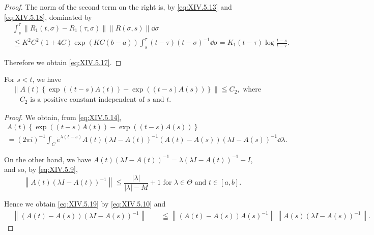 \begin{proof}
The norm of the second term on the right is, by \eqref{eq:XIV.5.13} and \eqref{eq:XIV.5.18}, dominated by 
\[
\begin{aligned}
&\int_{s} ^{\tau} \left\| R _{1} (t, \sigma) - R _{1} (\tau , \sigma) \right\| \left\| R (\sigma , s) \right\| \dd \sigma
\\
&\leqq K ^{2} C ^{2} (1 + 4 C) \exp (K C (b - a)) \int_{s} ^{\tau} (t - \tau) (t - \sigma) ^{-1} \dd \sigma = K _{1} (t - \tau) \log \frac {t - s}{t - \tau}.
\end{aligned}
\]

Therefore we obtain \eqref{eq:XIV.5.17}. 
\end{proof}

\begin{lemma}\label{lem:XIV.5.Lemma.3} For $s < t$, we have 
\begin{equation}\label{eq:XIV.5.19}
\begin{aligned} & {\left\| A (t) \left\{\exp ((t - s) A (t)) - \exp ((t - s) A (s)) \right\} \right\| \leqq C _{2}, \text{ where }} \\ & {\quad C _{2} \text{ is a positive constant independent of } s \text{ and } t.} \end{aligned}
\end{equation}
\end{lemma}

\begin{proof}
 We obtain, from \eqref{eq:XIV.5.14}, 
\[
\begin{gathered}
A (t) \left\{\exp ((t - s) A (t)) - \exp ((t - s) A (s)) \right\}
\\
= (2 \pi i) ^{-1} \int_{C} \dot {e} ^{\lambda (t - s)} A (t) (\lambda I - A (t)) ^{-1} (A (t) - A (s)) (\lambda I - A (s)) ^{-1} \dd \lambda . \end{gathered}
\]

On the other hand, we have $A(t)(\lambda I - A(t))^{-1} = \lambda (\lambda I - A(t))^{-1} - I$, and so, by \eqref{eq:XIV.5.9}, 
\begin{equation}\label{eq:XIV.5.20}
\left\| A (t) (\lambda I - A (t)) ^{-1} \right\| \leqq \frac {| \lambda |}{| \lambda | - M} + 1 \text{ for } \lambda \in \Theta \text{ and } t \in [ a, b ].
\end{equation}

Hence we obtain \eqref{eq:XIV.5.19} by \eqref{eq:XIV.5.10} and 
\[
\begin{aligned}
&{\left\| (A (t) - A (s)) (\lambda I - A (s)) ^{-1} \right\|} {\qquad \leqq \left\| (A (t) - A (s)) A (s) ^{-1} \right\| \left\| A (s) (\lambda I - A (s)) ^{-1} \right\|.}
\end{aligned}
\]
\end{proof}

